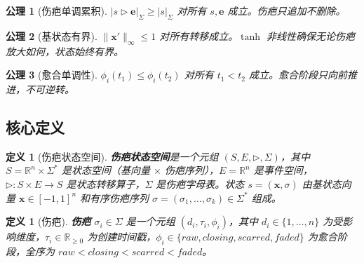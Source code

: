 \documentclass[11pt]{article}
\newtheorem{definition}[theorem]{定义}
\newtheorem{axiom}{公理}[section]
\begin{document}
\begin{axiom}[伤疤单调累积]
\label{ax:scar-mono}
$|s \triangleright \mathbf{e}|_\Sigma \geq |s|_\Sigma$ 对所有 $s, \mathbf{e}$ 成立。伤疤只追加不删除。
\end{axiom}

\begin{axiom}[基状态有界]
\label{ax:scar-bounded}
$\|\mathbf{x}'\|_\infty \leq 1$ 对所有转移成立。$\tanh$ 非线性确保无论伤疤放大如何，状态始终有界。
\end{axiom}

\begin{axiom}[愈合单调性]
\label{ax:scar-heal}
$\phi_i(t_1) \leq \phi_i(t_2)$ 对所有 $t_1 < t_2$ 成立。愈合阶段只向前推进，不可逆转。
\end{axiom}

\subsection{核心定义}

\begin{definition}[伤疤状态空间]
\label{def:scar-space}
\textbf{伤疤状态空间}是一个元组 $(S, E, \triangleright, \Sigma)$，其中 $S = \mathbb{R}^n \times \Sigma^*$ 是状态空间（基向量 $\times$ 伤疤序列），$E = \mathbb{R}^n$ 是事件空间，$\triangleright: S \times E \to S$ 是状态转移算子，$\Sigma$ 是伤疤字母表。状态 $s = (\mathbf{x}, \sigma)$ 由基状态向量 $\mathbf{x} \in [-1,1]^n$ 和有序伤疤序列 $\sigma = (\sigma_1, \ldots, \sigma_k) \in \Sigma^*$ 组成。
\end{definition}

\begin{definition}[伤疤]
\label{def:scar}
\textbf{伤疤} $\sigma_i \in \Sigma$ 是一个元组 $(d_i, \tau_i, \phi_i)$，其中 $d_i \in \{1, \ldots, n\}$ 为受影响维度，$\tau_i \in \mathbb{R}_{\geq 0}$ 为创建时间戳，$\phi_i \in \{raw, closing, scarred, faded\}$ 为愈合阶段，全序为 $raw < closing < scarred < faded$。
\end{definition}
\end{document}
